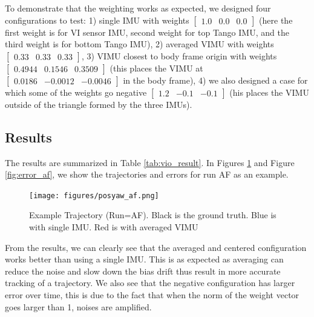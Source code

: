 \documentclass[conference]{IEEEtran}
\begin{document}
To demonstrate that the weighting works as expected, we designed four configurations to test: 1) single IMU with weights $[\begin{matrix} 1.0 & 0.0 & 0.0 \end{matrix}]$ (here the first weight is for VI sensor IMU, second weight for top Tango IMU, and the third weight is for bottom Tango IMU), 2) averaged VIMU with weights $[\begin{matrix} 0.33 & 0.33 & 0.33 \end{matrix}]$, 3) VIMU closest to body frame origin with weights $[\begin{matrix} 0.4944 & 0.1546 & 0.3509 \end{matrix}]$ (this places the VIMU at $[\begin{matrix} 0.0186 & -0.0012 & -0.0046 \end{matrix}]$ in the body frame), 4) we also designed a case for which some of the weights go negative $[\begin{matrix} 1.2 & -0.1 & -0.1 \end{matrix}]$ (his places the VIMU outside of the triangle formed by the three IMUs).

\subsection{Results}

The results are summarized in Table \ref{tab:vio_result}. In Figures \ref{fig:posyaw_af} and Figure \ref{fig:error_af}, we show the trajectories and errors for run AF as an example.

\begin{figure}
    \centering
    \texttt{[image: figures/posyaw\_af.png]}
    \caption{Example Trajectory (Run=AF). Black is the ground truth. Blue is with single IMU. Red is with averaged VIMU}
    \label{fig:posyaw_af}
\end{figure}

From the results, we can clearly see that the averaged and centered configuration works better than using a single IMU. This is as expected as averaging can reduce the noise and slow down the bias drift thus result in more accurate tracking of a trajectory. We also see that the negative configuration has larger error over time, this is due to the fact that when the norm of the weight vector goes larger than 1, noises are amplified.

\end{document}
